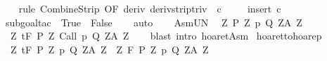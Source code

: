 \begin{isabellebody}
%
\isadelimproof
\ \ %
\endisadelimproof
%
\isatagproof
{}\isamarkupfalse%
\ {\isacharparenleft}rule\ CombineStrip{\isacharprime}\ {\isacharbrackleft}OF\ deriv\ deriv{\isacharunderscore}strip{\isacharunderscore}triv\ {\isacharunderscore}\ c{\isacharbrackright}{\isacharparenright}\ \isanewline
\ \ \isamarkupfalse%
\ {\isacharparenleft}insert\ c{\isacharprime}{\isacharprime}{\isacharparenright}\isanewline
\ \ \isamarkupfalse%
\ {\isacharparenleft}subgoal{\isacharunderscore}tac\ {\isachardoublequoteopen}{\isacharminus}\ {\isacharbraceleft}True{\isacharbraceright}\ {\isacharequal}\ {\isacharbraceleft}False{\isacharbraceright}{\isachardoublequoteclose}{\isacharparenright}\isanewline
\ \ \isamarkupfalse%
\ auto\isanewline
\ \ \isamarkupfalse%
%
\endisatagproof
{\isafoldproof}%
%
\isadelimproof
\isanewline
%
\endisadelimproof
\isanewline
{}\isamarkupfalse%
\ AsmUN{\isacharcolon}\isanewline
\ \ {\isachardoublequoteopen}{\isacharparenleft}{\isasymUnion}Z{\isachardot}\ {\isacharbraceleft}{\isacharparenleft}P\ Z{\isacharcomma}\ p{\isacharcomma}\ Q\ Z{\isacharcomma}A\ Z{\isacharparenright}{\isacharbraceright}{\isacharparenright}\ {\isasymsubseteq}\ {\isasymTheta}\ \isanewline
\ \ {\isasymLongrightarrow}\ \isanewline
\ \ {\isasymforall}Z{\isachardot}\ {\isasymGamma}{\isacharcomma}{\isasymTheta}{\isasymturnstile}\isactrlsub t\isactrlbsub {\isacharslash}F\isactrlesub \ {\isacharparenleft}P\ Z{\isacharparenright}\ {\isacharparenleft}Call\ p{\isacharparenright}\ {\isacharparenleft}Q\ Z{\isacharparenright}{\isacharcomma}{\isacharparenleft}A\ Z{\isacharparenright}{\isachardoublequoteclose}\isanewline
%
\isadelimproof
\ \ %
\endisadelimproof
%
\isatagproof
{}\isamarkupfalse%
\ {\isacharparenleft}blast\ intro{\isacharcolon}\ hoaret{\isachardot}Asm{\isacharparenright}%
\endisatagproof
{\isafoldproof}%
%
\isadelimproof
\isanewline
%
\endisadelimproof
\isanewline
\isanewline
{}\isamarkupfalse%
\ hoaret{\isacharunderscore}to{\isacharunderscore}hoarep{\isacharprime}{\isacharcolon}\isanewline
\ \ {\isachardoublequoteopen}{\isasymforall}Z{\isachardot}\ {\isasymGamma}{\isacharcomma}{\isacharbraceleft}{\isacharbraceright}{\isasymturnstile}\isactrlsub t\isactrlbsub {\isacharslash}F\isactrlesub \ {\isacharparenleft}P\ Z{\isacharparenright}\ p\ {\isacharparenleft}Q\ Z{\isacharparenright}{\isacharcomma}{\isacharparenleft}A\ Z{\isacharparenright}\ {\isasymLongrightarrow}\ {\isasymforall}Z{\isachardot}\ {\isasymGamma}{\isacharcomma}{\isacharbraceleft}{\isacharbraceright}{\isasymturnstile}\isactrlbsub {\isacharslash}F\isactrlesub \ {\isacharparenleft}P\ Z{\isacharparenright}\ p\ {\isacharparenleft}Q\ Z{\isacharparenright}{\isacharcomma}{\isacharparenleft}A\ Z{\isacharparenright}{\isachardoublequoteclose}\isanewline

\end{isabellebody}
